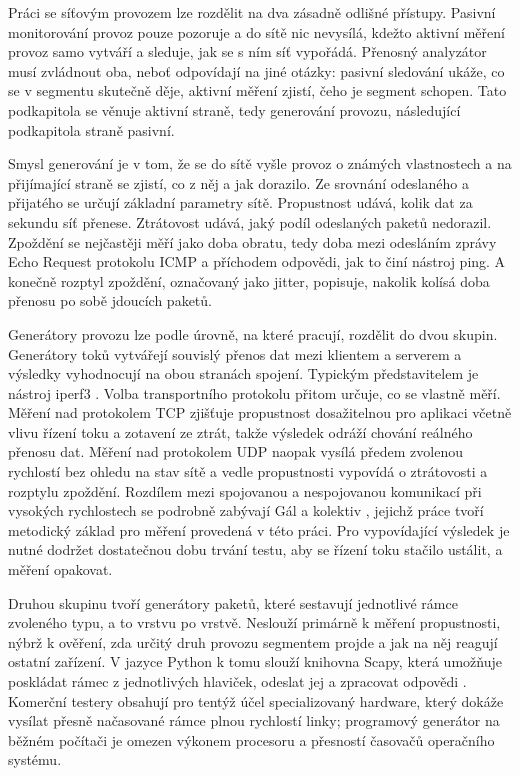 Práci se síťovým provozem lze rozdělit na dva zásadně odlišné přístupy. Pasivní monitorování provoz pouze pozoruje a do sítě nic nevysílá, kdežto aktivní měření provoz samo vytváří a sleduje, jak se s ním síť vypořádá. Přenosný analyzátor musí zvládnout oba, neboť odpovídají na jiné otázky: pasivní sledování ukáže, co se v segmentu skutečně děje, aktivní měření zjistí, čeho je segment schopen. Tato podkapitola se věnuje aktivní straně, tedy generování provozu, následující podkapitola straně pasivní.

Smysl generování je v tom, že se do sítě vyšle provoz o známých vlastnostech a na přijímající straně se zjistí, co z něj a jak dorazilo. Ze srovnání odeslaného a přijatého se určují základní parametry sítě. Propustnost udává, kolik dat za sekundu síť přenese. Ztrátovost udává, jaký podíl odeslaných paketů nedorazil. Zpoždění se nejčastěji měří jako doba obratu, tedy doba mezi odesláním zprávy Echo Request protokolu ICMP a příchodem odpovědi, jak to činí nástroj ping. A konečně rozptyl zpoždění, označovaný jako jitter, popisuje, nakolik kolísá doba přenosu po sobě jdoucích paketů.

Generátory provozu lze podle úrovně, na které pracují, rozdělit do dvou skupin. Generátory toků vytvářejí souvislý přenos dat mezi klientem a serverem a výsledky vyhodnocují na obou stranách spojení. Typickým představitelem je nástroj iperf3 \cite{iperf3}. Volba transportního protokolu přitom určuje, co se vlastně měří. Měření nad protokolem TCP zjišťuje propustnost dosažitelnou pro aplikaci včetně vlivu řízení toku a zotavení ze ztrát, takže výsledek odráží chování reálného přenosu dat. Měření nad protokolem UDP naopak vysílá předem zvolenou rychlostí bez ohledu na stav sítě a vedle propustnosti vypovídá o ztrátovosti a rozptylu zpoždění. Rozdílem mezi spojovanou a nespojovanou komunikací při vysokých rychlostech se podrobně zabývají Gál a kolektiv \cite{gal2021}, jejichž práce tvoří metodický základ pro měření provedená v této práci. Pro vypovídající výsledek je nutné dodržet dostatečnou dobu trvání testu, aby se řízení toku stačilo ustálit, a měření opakovat.

Druhou skupinu tvoří generátory paketů, které sestavují jednotlivé rámce zvoleného typu, a to vrstvu po vrstvě. Neslouží primárně k měření propustnosti, nýbrž k ověření, zda určitý druh provozu segmentem projde a jak na něj reagují ostatní zařízení. V jazyce Python k tomu slouží knihovna Scapy, která umožňuje poskládat rámec z jednotlivých hlaviček, odeslat jej a zpracovat odpovědi \cite{carter2024}. Komerční testery obsahují pro tentýž účel specializovaný hardware, který dokáže vysílat přesně načasované rámce plnou rychlostí linky; programový generátor na běžném počítači je omezen výkonem procesoru a přesností časovačů operačního systému.


